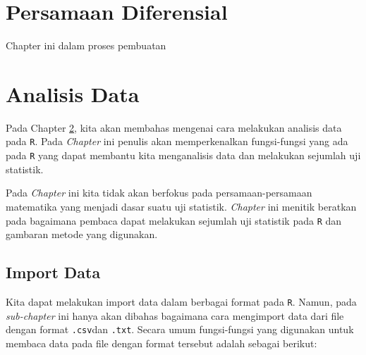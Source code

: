 \documentclass[]{book}
\theoremstyle{definition}
\theoremstyle{definition}
\theoremstyle{definition}
\theoremstyle{remark}
\begin{document}
\hypertarget{diffeq}{%
\chapter{Persamaan Diferensial}\label{diffeq}}

Chapter ini dalam proses pembuatan

\hypertarget{dataanalysis}{%
\chapter{Analisis Data}\label{dataanalysis}}

Pada Chapter \ref{dataanalysis}, kita akan membahas mengenai cara melakukan analisis data pada \texttt{R}. Pada \emph{Chapter} ini penulis akan memperkenalkan fungsi-fungsi yang ada pada \texttt{R} yang dapat membantu kita menganalisis data dan melakukan sejumlah uji statistik.

Pada \emph{Chapter} ini kita tidak akan berfokus pada persamaan-persamaan matematika yang menjadi dasar suatu uji statistik. \emph{Chapter} ini menitik beratkan pada bagaimana pembaca dapat melakukan sejumlah uji statistik pada \texttt{R} dan gambaran metode yang digunakan.

\hypertarget{importdata}{%
\section{Import Data}\label{importdata}}

Kita dapat melakukan import data dalam berbagai format pada \texttt{R}. Namun, pada \emph{sub-chapter} ini hanya akan dibahas bagaimana cara mengimport data dari file dengan format \texttt{.csv}dan \texttt{.txt}. Secara umum fungsi-fungsi yang digunakan untuk membaca data pada file dengan format tersebut adalah sebagai berikut:
\end{document}
